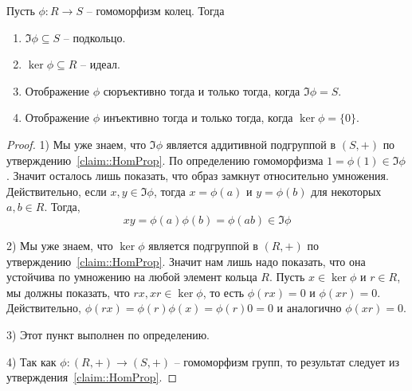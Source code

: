 \begin{claim}
\label{claim::RingHomProp}
Пусть $\phi\colon R\to S$ -- гомоморфизм колец.
Тогда
\begin{enumerate}
\item $\Im\phi\subseteq S$ -- подкольцо.

\item $\ker \phi\subseteq R$ -- идеал.

\item Отображение $\phi$ сюръективно тогда и только тогда, когда $\Im\phi = S$.

\item Отображение $\phi$ инъективно тогда и только тогда, когда $\ker \phi = \{0\}$.
\end{enumerate}
\end{claim}
\begin{proof}
1) Мы уже знаем, что $\Im \phi$ является аддитивной подгруппой в $(S, + )$ по утверждению~\ref{claim::HomProp}.
По определению гомоморфизма $1 = \phi(1) \in \Im \phi$.
Значит осталось лишь показать, что образ замкнут относительно умножения.
Действительно, если $x,y\in \Im\phi$, тогда $x = \phi(a)$ и $y = \phi(b)$ для некоторых $a,b\in R$.
Тогда,
\[
xy = \phi(a) \phi(b) = \phi(ab) \in \Im \phi
\]

2) Мы уже знаем, что $\ker \phi$ является подгруппой в $(R, +)$ по утверждению~\ref{claim::HomProp}.
Значит нам лишь надо показать, что она устойчива по умножению на любой элемент кольца $R$.
Пусть $x\in \ker \phi$ и $r\in R$, мы должны показать, что  $rx, xr \in \ker \phi$, то есть $\phi(rx) = 0$ и $\phi(xr) = 0$.
Действительно, $\phi(rx) = \phi(r)\phi(x) = \phi(r) 0 = 0$ и аналогично $\phi(xr) = 0$.

3) Этот пункт выполнен по определению.

4) Так как $\phi\colon (R,+)\to (S,+)$ -- гомоморфизм групп, то результат следует из утверждения~\ref{claim::HomProp}.
\end{proof}

